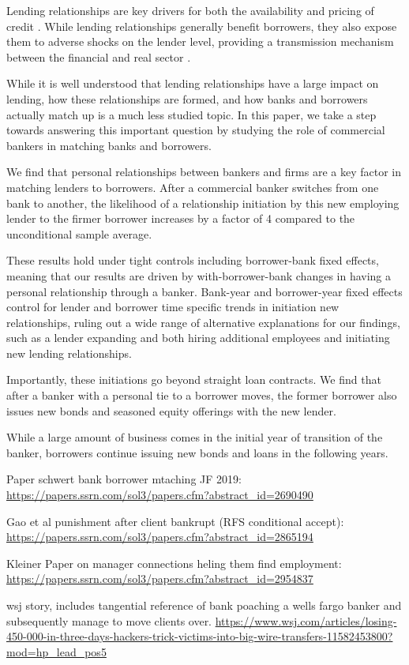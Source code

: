 

Lending relationships are key drivers for both the availability and pricing of credit \citep{Bharath2007, Ioannidou2010}. While lending relationships generally benefit borrowers, they also expose them to adverse shocks on the lender level, providing a transmission mechanism between the financial and real sector \citep{Ivashina2010, chodorow2014}. 

While it is well understood that lending relationships have a large impact on lending, how these relationships are formed, and how banks and borrowers actually match up is a much less studied topic. In this paper, we take a step towards answering this important question by studying the role of commercial bankers in matching banks and borrowers. 

We find that personal relationships between bankers and firms are a key factor in matching lenders to borrowers. After a commercial banker switches from one bank to another, the likelihood of a relationship initiation by this new employing lender to the firmer borrower increases by a factor of 4 compared to the unconditional sample average. 

These results hold under tight controls including borrower-bank fixed effects, meaning that our results are driven by with-borrower-bank changes in having a personal relationship through a banker. Bank-year and borrower-year fixed effects control for lender and borrower time specific trends in initiation new relationships, ruling out a wide range of alternative explanations for our findings, such as a lender expanding and both hiring additional employees and initiating new lending relationships. 


Importantly, these initiations go beyond straight loan contracts. We find that after a banker with a personal tie to a borrower moves, the former borrower also issues new bonds and seasoned equity offerings with the new lender. 

While a large amount of business comes in the initial year of transition of the banker, borrowers continue issuing new bonds and loans in the following years.

Paper schwert bank borrower mtaching JF 2019:
\url{https://papers.ssrn.com/sol3/papers.cfm?abstract_id=2690490}

Gao et al punishment after client bankrupt (RFS conditional accept):
\url{https://papers.ssrn.com/sol3/papers.cfm?abstract_id=2865194}

Kleiner Paper on manager connections heling them find employment:
\url{https://papers.ssrn.com/sol3/papers.cfm?abstract_id=2954837}

wsj story, includes tangential reference of bank poaching a wells fargo banker and subsequently manage to move clients over. 
\url{https://www.wsj.com/articles/losing-450-000-in-three-days-hackers-trick-victims-into-big-wire-transfers-11582453800?mod=hp_lead_pos5}



